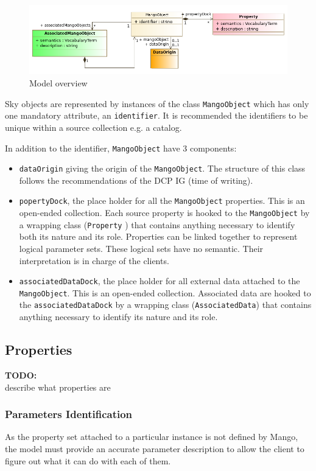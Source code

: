 \documentclass[11pt,a4paper]{ivoa}
\newcommand{\TODO}[1]{%
    \noindent%
    \colorbox{todocolor}{%
            \parbox{0.85\linewidth}{\sffamily \textbf{TODO:}\\
            #1}
    }%
    \vspace{2pt}

}
\begin{document}
\begin{figure}
     \includegraphics[width=1.0\textwidth]{../model/overview.png}
     \caption{Model overview}
     \label{overview}
\end{figure}

Sky objects are represented by instances of the class \texttt{MangoObject} which has only
one mandatory attribute, an \texttt{identifier}.
It is recommended the identifiers to be unique within a source collection e.g. a catalog.

In addition to the identifier, \texttt{MangoObject}  have 3 components:

\begin{itemize}
  \item \texttt{dataOrigin} giving the origin of the \texttt{MangoObject}. The structure of this class follows
        the recommendations of the DCP IG (time of writing).
  \item \texttt{popertyDock}, the place holder for all the \texttt{MangoObject} properties.
        This is an open-ended collection.
        Each source property is hooked to the \texttt{MangoObject} by a wrapping class (\texttt{Property} )
        that contains anything necessary to identify both its nature and its role.
        Properties can be linked together to represent logical parameter sets. 
        These logical sets have no semantic. Their interpretation is in charge of the clients.
  \item \texttt{associatedDataDock}, the place holder for all external data attached to the \texttt{MangoObject}.
        This is an open-ended collection.
  		Associated data are hooked to the \texttt{associatedDataDock} by a wrapping class (\texttt{AssociatedData})
        that contains anything necessary to identify its nature and its role.
\end{itemize}
\subsection{Properties}

\TODO{describe what properties are}

\subsubsection{Parameters Identification}
As the property set  attached to a particular instance is not defined by Mango,
the model must provide an accurate parameter description to allow the client to figure
out what it can do with each of them.
\end{document}
